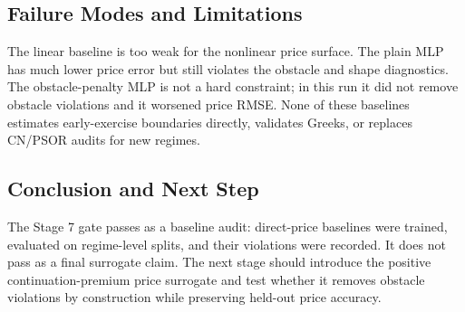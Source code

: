 \documentclass[11pt]{article}
\begin{document}


\subsection{Failure Modes and Limitations}
The linear baseline is too weak for the nonlinear price surface. The plain MLP has much lower price error but still violates the obstacle and shape diagnostics. The obstacle-penalty MLP is not a hard constraint; in this run it did not remove obstacle violations and it worsened price RMSE. None of these baselines estimates early-exercise boundaries directly, validates Greeks, or replaces CN/PSOR audits for new regimes.

\subsection{Conclusion and Next Step}
The Stage 7 gate passes as a baseline audit: direct-price baselines were trained, evaluated on regime-level splits, and their violations were recorded. It does not pass as a final surrogate claim. The next stage should introduce the positive continuation-premium price surrogate and test whether it removes obstacle violations by construction while preserving held-out price accuracy.
\end{document}
